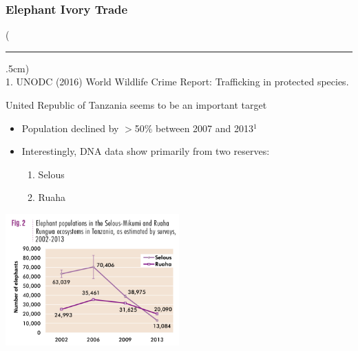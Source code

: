 \documentclass[10pt]{beamer}
\newenvironment{reference}[2]{%
	\begin{textblock*}{\textwidth}(#1,#2)
		\tiny\bgroup\color{gray}}{\egroup\end{textblock*}}
\begin{document}
\begin{frame}[t]
\frametitle{Elephant Ivory Trade}
\vspace{0.5cm}

	\begin{reference}{4mm}{92mm}
		\rule{1.5cm}{0.25pt}\\
		1. UNODC (2016) World Wildlife Crime Report: Trafficking in protected species.
	\end{reference}
	
	United Republic of Tanzania seems to be an important target\\
	\medskip
		\begin{itemize}
			\item Population declined by $>$50\% between 2007 and 2013$^{1}$
			\medskip
			\item Interestingly, DNA data show primarily from two reserves:
				\begin{enumerate}
					\item Selous
					\item Ruaha
				\end{enumerate}
		\end{itemize}
	
	\begin{center}
		\includegraphics[width=0.5\textwidth]{figures/ePoaching2.png}
	\end{center}	
\end{frame}
\end{document}
